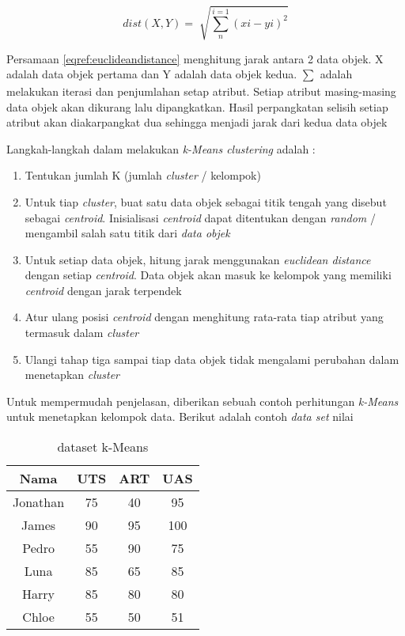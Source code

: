 \begin{equation}
	dist(X,Y) = \sqrt[]{\sum_{n}^{i=1}(xi-yi)^2}
	\label{eqref:euclideandistance}
\end{equation}

Persamaan \eqref{eqref:euclideandistance} menghitung jarak antara 2 data objek. X adalah data objek pertama dan Y adalah data objek kedua. $\sum_{}^{}$ adalah melakukan iterasi dan penjumlahan setap atribut. Setiap atribut masing-masing data objek akan dikurang lalu dipangkatkan. Hasil perpangkatan selisih setiap atribut akan diakarpangkat dua sehingga menjadi jarak dari kedua data objek

Langkah-langkah dalam melakukan \textit{k-Means clustering} adalah : 
\begin{enumerate}
\item Tentukan jumlah K (jumlah \textit{cluster} / kelompok)
\item Untuk tiap \textit{cluster}, buat satu data objek sebagai titik tengah yang disebut sebagai \textit{centroid}. Inisialisasi \textit{centroid} dapat ditentukan dengan \textit{random} / mengambil salah satu titik dari \textit{data objek} 
\item Untuk setiap data objek, hitung jarak menggunakan \textit{euclidean distance} dengan setiap \textit{centroid}. Data objek akan masuk ke kelompok yang memiliki \textit{centroid} dengan jarak terpendek
\item Atur ulang posisi \textit{centroid} dengan menghitung rata-rata tiap atribut yang termasuk dalam \textit{cluster} 
\item Ulangi tahap tiga sampai tiap data objek tidak mengalami perubahan dalam menetapkan \textit{cluster}
\end{enumerate}

Untuk mempermudah penjelasan, diberikan sebuah contoh perhitungan \textit{k-Means} untuk menetapkan kelompok data. Berikut adalah contoh \textit{data set} nilai 

\begin{table}[ht]
\centering
\begin{tabular}{|c|c|c|c|}
\hline 
Nama & UTS & ART & UAS \\ 
\hline 
Jonathan & 75 & 40 & 95 \\ 
\hline 
James & 90 & 95 & 100 \\ 
\hline 
Pedro & 55 & 90 & 75 \\ 
\hline 
Luna & 85 & 65 & 85 \\ 
\hline 
Harry & 85 & 80 & 80 \\ 
\hline 
Chloe & 55 & 50 & 51 \\ 
\hline 
\end{tabular} 
\caption{dataset k-Means}
\label{tab:datasetkmeans}
\end{table}

